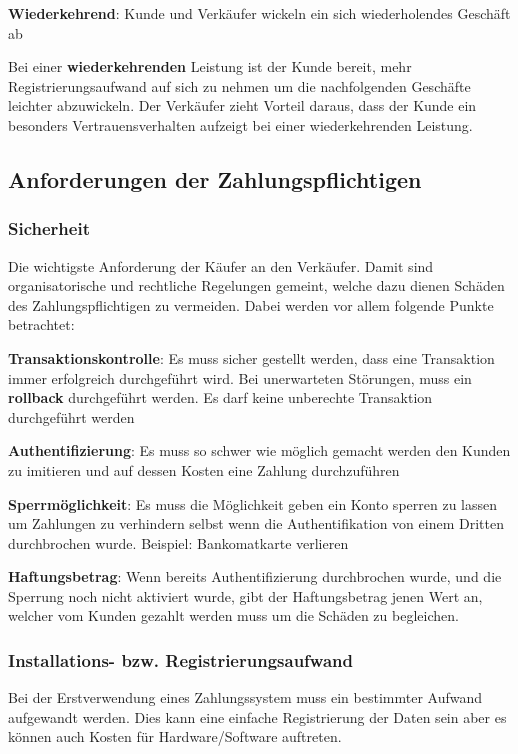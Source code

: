 \textbf{Wiederkehrend}: Kunde und Verkäufer wickeln ein sich wiederholendes Geschäft ab
 
Bei einer \textbf{wiederkehrenden} Leistung ist der Kunde bereit, mehr Registrierungsaufwand auf sich zu nehmen um die nachfolgenden Geschäfte leichter abzuwickeln. Der Verkäufer zieht Vorteil daraus, dass der Kunde ein besonders Vertrauensverhalten aufzeigt bei einer wiederkehrenden Leistung. 

\subsection{Anforderungen der Zahlungspflichtigen}
\subsubsection{Sicherheit}
Die wichtigste Anforderung der Käufer an den Verkäufer. Damit sind organisatorische und rechtliche Regelungen gemeint, welche dazu dienen Schäden des Zahlungspflichtigen zu vermeiden. Dabei werden vor allem folgende Punkte betrachtet:

\textbf{Transaktionskontrolle}: Es muss sicher gestellt werden, dass eine Transaktion immer erfolgreich durchgeführt wird. Bei unerwarteten Störungen, muss ein \textbf{rollback} durchgeführt werden. Es darf keine unberechte Transaktion durchgeführt werden

\textbf{Authentifizierung}: Es muss so schwer wie möglich gemacht werden den Kunden zu imitieren und auf dessen Kosten eine Zahlung durchzuführen

\textbf{Sperrmöglichkeit}: Es muss die Möglichkeit geben ein Konto sperren zu lassen um Zahlungen zu verhindern selbst wenn die Authentifikation von einem Dritten durchbrochen wurde. Beispiel: Bankomatkarte verlieren

\textbf{Haftungsbetrag}: Wenn bereits Authentifizierung durchbrochen wurde, und die Sperrung noch nicht aktiviert wurde, gibt der Haftungsbetrag jenen Wert an, welcher vom Kunden gezahlt werden muss um die Schäden zu begleichen.

\subsubsection{Installations- bzw. Registrierungsaufwand}
Bei der Erstverwendung eines Zahlungssystem muss ein bestimmter Aufwand aufgewandt werden. Dies kann eine einfache Registrierung der Daten sein aber es können auch Kosten für Hardware/Software auftreten.

